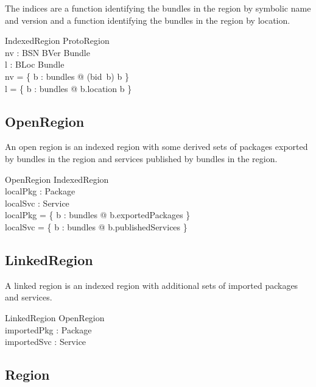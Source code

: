 \documentclass[a4paper,9pt]{article}
\begin{document}
The indices are a function identifying the bundles in the region by
symbolic name and version and a function identifying the bundles in the region by location.
\begin{schema}{IndexedRegion}
  ProtoRegion \\
  nv : BSN \cross BVer \pinj Bundle \\
  l : BLoc \pinj Bundle \\
\where
  nv = \{ b : bundles @ (bid~b) \mapsto b \} \\
  l = \{ b : bundles @ b.location \mapsto b \} \\
\end{schema}

\subsection{OpenRegion}

An open region is an indexed region with some derived sets of packages exported by bundles in the region
and services published by bundles in the region.

\begin{schema}{OpenRegion}
  IndexedRegion \\
  localPkg : \power Package \\
  localSvc : \power Service \\
\where
  localPkg = \bigcup \{ b : bundles @ b.exportedPackages \} \\
  localSvc = \bigcup \{ b : bundles @ b.publishedServices \} \\
\end{schema}

\subsection{LinkedRegion}

A linked region is an indexed region with additional sets of imported packages and services.

\begin{schema}{LinkedRegion}
  OpenRegion \\
  importedPkg : \power Package \\
  importedSvc : \power Service \\  
\end{schema}

\subsection{Region}
\end{document}
